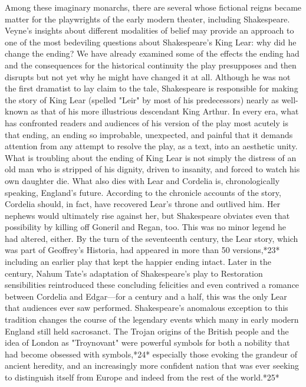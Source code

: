 	Among these imaginary monarchs, there are several whose fictional reigns became matter for the playwrights of the early modern theater, including Shakespeare. Veyne's insights about different modalities of belief may provide an approach to one of the most bedeviling questions about Shakespeare's King Lear: why did he change the ending? We have already examined some of the effects the ending had and the consequences for the historical continuity the play presupposes and then disrupts but not yet why he might have changed it at all. Although he was not the first dramatist to lay claim to the tale, Shakespeare is responsible for making the story of King Lear (spelled "Leir" by most of his predecessors) nearly as well-known as that of his more illustrious descendant King Arthur. In every era, what has confronted readers and audiences of his version of the play most acutely is that ending, an ending so improbable, unexpected, and painful that it demands attention from any attempt to resolve the play, as a text, into an aesthetic unity. What is troubling about the ending of King Lear is not simply the distress of an old man who is stripped of his dignity, driven to insanity, and forced to watch his own daughter die. What also dies with Lear and Cordelia is, chronologically speaking, England's future. According to the chronicle accounts of the story, Cordelia should, in fact, have recovered Lear's throne and outlived him. Her nephews would ultimately rise against her, but Shakespeare obviates even that possibility by killing off Goneril and Regan, too. This was no minor legend he had altered, either. By the turn of the seventeenth century, the Lear story, which was part of Geoffrey's Historia, had appeared in more than 50 versions,*23* including an earlier play that kept the happier ending intact. Later in the century, Nahum Tate's adaptation of Shakespeare's play to Restoration sensibilities reintroduced these concluding felicities and even contrived a romance between Cordelia and Edgar—for a century and a half, this was the only Lear that audiences ever saw performed. Shakespeare's anomalous exception to this tradition changes the course of the legendary events which many in early modern England still held sacrosanct. The Trojan origins of the British people and the idea of London as "Troynovant" were powerful symbols for both a nobility that had become obsessed with symbols,*24* especially those evoking the grandeur of ancient heredity, and an increasingly more confident nation that was ever seeking to distinguish itself from Europe and indeed from the rest of the world.*25*
